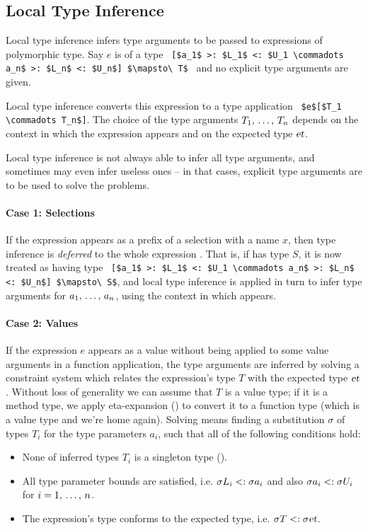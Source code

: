 \subsection{Local Type Inference}
\label{sec:local-type-inference}

Local type inference infers type arguments to be passed to expressions of polymorphic type. Say $e$ is of a type ~\lstinline![$a_1$ >: $L_1$ <: $U_1 \commadots a_n$ >: $L_n$ <: $U_n$] $\mapsto\ T$!~ and no explicit type arguments are given. 

Local type inference converts this expression to a type application ~\lstinline!$e$[$T_1 \commadots T_n$]!. The choice of the type arguments $T_1 ,\, \ldots ,\, T_n$ depends on the context in which the expression appears and on the expected type $\mbox{\sl et}$. 

Local type inference is not always able to infer all type arguments, and sometimes may even infer useless ones -- in that cases, explicit type arguments are to be used to solve the problems. 

\paragraph{Case 1: Selections}
If the expression appears as a prefix of a selection with a name $x$, then type inference is {\em deferred} to the whole expression . That is, if  has type $S$, it is now treated as having type ~\lstinline![$a_1$ >: $L_1$ <: $U_1 \commadots a_n$ >: $L_n$ <: $U_n$] $\mapsto\ S$!, and local type inference is applied in turn to infer type arguments for $a_1 ,\, \ldots ,\, a_n$, using the context in which  appears. 

\paragraph{Case 2: Values}
If the expression $e$ appears as a value without being applied to some value arguments in a function application, the type arguments are inferred by solving a constraint system which relates the expression's type $T$ with the expected type $\mbox{\sl et}$. Without loss of generality we can assume that $T$ is a value type; if it is a method type, we apply eta-expansion () to convert it to a function type (which is a value type and we're home again). Solving means finding a substitution $\sigma$ of types $T_i$ for the type parameters $a_i$, such that all of the following conditions hold:
\begin{itemize}
\item None of inferred types $T_i$ is a singleton type (). %
\item All type parameter bounds are satisfied, i.e. $\sigma L_i <: \sigma a_i$ and also $\sigma a_i <: \sigma U_i$ for $i = 1 ,\, \ldots ,\, n$. 
\item The expression's type conforms to the expected type, i.e. $\sigma T <: \sigma \mbox{\sl et}$. 
\end{itemize}

